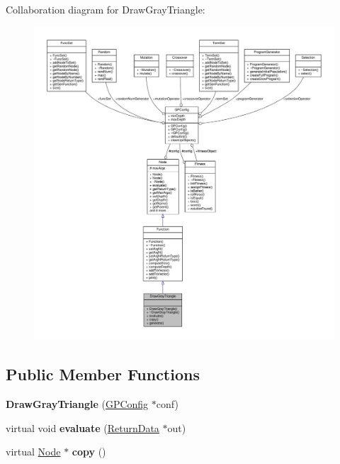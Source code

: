 Collaboration diagram for Draw\+Gray\+Triangle\+:
\nopagebreak
\begin{figure}[H]
\begin{center}
\leavevmode
\includegraphics[width=350pt]{classDrawGrayTriangle__coll__graph}
\end{center}
\end{figure}
\subsection*{Public Member Functions}
\begin{DoxyCompactItemize}
\item 
\hypertarget{classDrawGrayTriangle_a7a518e20ef8d09167ce78beb13c736cd}{}\label{classDrawGrayTriangle_a7a518e20ef8d09167ce78beb13c736cd} 
{\bfseries Draw\+Gray\+Triangle} (\hyperlink{classGPConfig}{G\+P\+Config} $\ast$conf)
\item 
\hypertarget{classDrawGrayTriangle_a17a78c3748736ef48dc8951b07361e68}{}\label{classDrawGrayTriangle_a17a78c3748736ef48dc8951b07361e68} 
virtual void {\bfseries evaluate} (\hyperlink{classReturnData}{Return\+Data} $\ast$out)
\item 
\hypertarget{classDrawGrayTriangle_a085f4c505bbb6ff6e129649f29917276}{}\label{classDrawGrayTriangle_a085f4c505bbb6ff6e129649f29917276} 
virtual \hyperlink{classNode}{Node} $\ast$ {\bfseries copy} ()
\end{DoxyCompactItemize}
